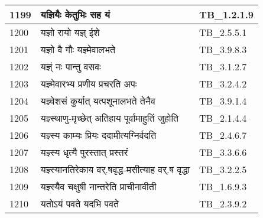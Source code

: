 \documentclass[17pt]{extarticle}
\begin{document}
\begin{longtable}{||p{0.4in}||p{4.9in}||p{0.9in}||}
    \hline
        
    1199 & यज्ञियैः केतुभिः सह यं & TB\_1.2.1.9       \\
    
    \hline
        
    1200 & यज्ञो रायो यज्ञ् ईशे & TB\_2.5.5.1       \\
    
    \hline
        
    1201 & यज्ञो वै गौः यज्ञ्मेवालभते & TB\_3.9.8.3       \\
    
    \hline
        
    1202 & यज्ञ्ं नः पान्तु वसवः & TB\_3.1.2.7       \\
    
    \hline
        
    1203 & यज्ञ्मेवारभ्य प्रणीय प्रचरति अपः & TB\_3.2.4.2       \\
    
    \hline
        
    1204 & यज्ञ्वेशसं कुर्यात् यत्पशूनालभते तेनैव & TB\_3.9.1.4       \\
    
    \hline
        
    1205 & यज्ञ्स्थाणु{-}मृच्छेत् अतिहाय पूर्वामाहुतिं जुहोति & TB\_2.1.4.4       \\
    
    \hline
        
    1206 & यज्ञ्स्य काम्यः प्रियः ददामीत्यग्निर्वदति & TB\_2.4.6.7       \\
    
    \hline
        
    1207 & यज्ञ्स्य धृत्यै पुरस्तात् प्रस्तरं & TB\_3.3.6.6       \\
    
    \hline
        
    1208 & यज्ञ्स्यानतिरेकाय वर्.षवृद्ध{-}मसीत्याह वर्.ष वृद्धा & TB\_3.2.2.5       \\
    
    \hline
        
    1209 & यज्ञ्स्यैव चक्षुषी नान्तरेति प्राचीनावीती & TB\_1.6.9.3       \\
    
    \hline
        
    1210 & यतोऽयं पवते यदभि पवते & TB\_2.3.9.2       \\
    
    \hline
        

\end{longtable}
\end{document}
